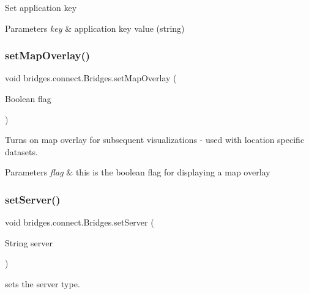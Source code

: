 Set application key


\begin{DoxyParams}{Parameters}
{\em key} & application key value (string) \\
\hline
\end{DoxyParams}
\mbox{\label{classbridges_1_1connect_1_1_bridges_a4af383ba2f114ad7bd4e08eb44096973}} 
\subsubsection{\texorpdfstring{set\+Map\+Overlay()}{setMapOverlay()}}
{\footnotesize\ttfamily void bridges.\+connect.\+Bridges.\+set\+Map\+Overlay (\begin{DoxyParamCaption}\item[{Boolean}]{flag }\end{DoxyParamCaption})}



Turns on map overlay for subsequent visualizations -\/ used with location specific datasets. 


\begin{DoxyParams}{Parameters}
{\em flag} & this is the boolean flag for displaying a map overlay \\
\hline
\end{DoxyParams}
\mbox{\label{classbridges_1_1connect_1_1_bridges_ab43e412448e1dfc340e58c407519a576}} 
\subsubsection{\texorpdfstring{set\+Server()}{setServer()}}
{\footnotesize\ttfamily void bridges.\+connect.\+Bridges.\+set\+Server (\begin{DoxyParamCaption}\item[{String}]{server }\end{DoxyParamCaption})}



sets the server type. 

